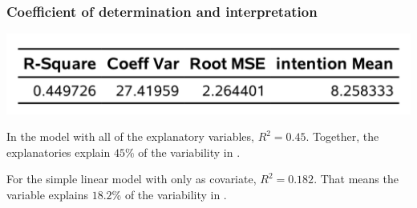 \documentclass{beamer}
\begin{document}
% 
% 
% 
% 

 \begin{frame}
\frametitle{Coefficient of determination and interpretation}
\begin{center}
\includegraphics[width=0.6\linewidth]{img/c2/slides3-e13}
\end{center}
\bi
\item In the model with all of the explanatory variables,
$R^2=0.45$. Together, the explanatories explain $45\%$ of the variability in .
\item For the simple linear model with only  as covariate, 
$R^2 = 0.182$. That means the variable  explains $18.2$\%
of the variability in .
\ei
\end{frame}
\end{document}
